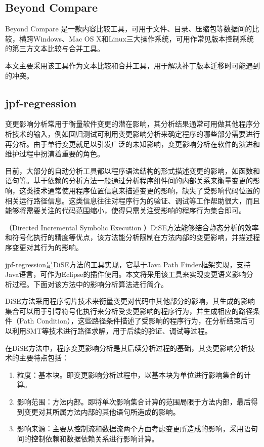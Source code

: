 	\subsection{Beyond Compare}
		
Beyond Compare 是一款内容比较工具，可用于文件、目录、压缩包等数据间的比较，横跨Windows、Mac OS X和Linux三大操作系统，可用作常见版本控制系统的第三方文本比较与合并工具。
      
本文主要采用该工具作为文本比较和合并工具，用于解决补丁版本迁移时可能遇到的冲突。


	\subsection{jpf-regression} 
变更影响分析常用于衡量软件变更的潜在影响，其分析结果通常可用做其他程序分析技术的输入，例如回归测试可利用变更影响分析来确定程序的哪些部分需要进行再分析。由于单行变更就足以引发广泛的未知影响，变更影响分析在软件的演进和维护过程中扮演着重要的角色。\cite{rungta2012change}

目前，大部分的自动分析工具都以程序语法结构的形式描述变更的影响，如函数和语句等。基于依赖的分析方法一般通过分析程序组件间的内部关系来衡量变更的影响，这类技术通常使用程序位置信息来描述变更的影响，缺失了受影响代码位置的相关运行路径信息。这类信息往往对程序行为的验证、调试等工作帮助很大，而且能够将需要关注的代码范围缩小，使得只需关注受影响的程序行为集合即可。

（Directed Incremental Symbolic Execution ）DiSE\cite{person2011directed,yang2014directed}方法能够结合静态分析的效率和符号化执行的精度等优点，该方法能分析限制在方法内部的变更影响，并描述程序变更对其行为的影响。

jpf-regression是DiSE方法的工具实现，它基于Java Path Finder框架\cite{havelund2000model}实现，支持Java语言，可作为Eclipse的插件使用。本文将采用该工具来实现变更语义影响分析过程。下面对该方法中的影响分析算法进行简介。

DiSE方法采用程序切片技术来衡量变更对代码中其他部分的影响，其生成的影响集合可以用于引导符号化执行来分析受变更影响的程序行为，并生成相应的路径条件（Path Condition），这些路径条件描述了受影响的程序行为，在分析结束后可以利用SMT等技术进行路径求解，用于后续的验证、调试等过程。

在DiSE方法中，程序变更影响分析是其后续分析过程的基础，其变更影响分析技术的主要特点包括：
\begin{enumerate}
	\item 粒度：基本块。即变更影响分析过程中，以基本块为单位进行影响集合的计算。
	\item 影响范围：方法内部。即将单次影响集合计算的范围局限于方法内部，最后得到变更对其所属方法内部的其他语句所造成的影响。
	\item 影响来源：主要从控制流和数据流两个方面考虑变更所造成的影响，采用语句间的控制依赖和数据依赖关系进行影响计算。
\end{enumerate}

